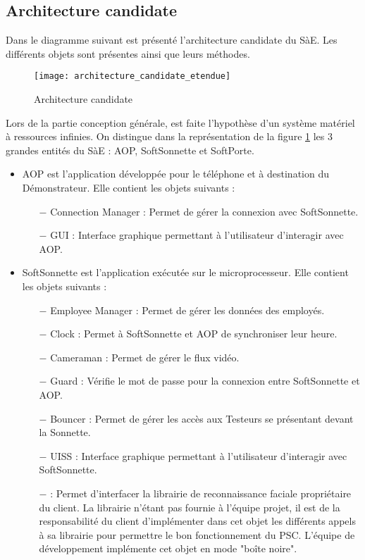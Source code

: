 \subsection{Architecture candidate}

Dans le diagramme suivant est présenté l'architecture candidate du SàE. 
Les différents objets sont présentes ainsi que leurs méthodes.

\begin{figure} [H]
    \centering
    \texttt{[image: architecture\_candidate\_etendue]}
    \caption{Architecture candidate}
    \label{Archicandidate}
\end{figure}

Lors de la partie conception générale, est faite l'hypothèse d'un système matériel à ressources infinies.
\newpage
On distingue dans la représentation de la figure \ref{Archicandidate} les 3 grandes entités du SàE : AOP, SoftSonnette et SoftPorte.

\begin{itemize}
    \item AOP est l'application  développée pour le téléphone et à destination du Démonstrateur. Elle contient les objets suivants :
    \begin{itemize}
        \item[$-$] Connection Manager : Permet de gérer la connexion avec SoftSonnette.
        \item[$-$] GUI : Interface graphique permettant à l'utilisateur d'interagir avec AOP.
    \end{itemize}
\end{itemize}

\begin{itemize}
    \item SoftSonnette est l'application exécutée sur le microprocesseur. Elle contient les objets suivants :
    \begin {itemize}
        \item[$-$] Employee Manager : Permet de gérer les données des employés.
        \item[$-$] Clock : Permet à SoftSonnette et AOP de synchroniser leur heure.
        \item[$-$] Cameraman : Permet de gérer le flux vidéo.
        \item[$-$] Guard : Vérifie le mot de passe pour la connexion entre SoftSonnette et AOP.
        \item[$-$] Bouncer : Permet de gérer les accès aux Testeurs se présentant devant la Sonnette.
        \item[$-$] UISS : Interface graphique permettant à l'utilisateur d'interagir avec SoftSonnette.
        \item[$-$] \IA : Permet d'interfacer la librairie de reconnaissance faciale propriétaire du client. 
        La librairie n'étant pas fournie à l'équipe projet, il est de la responsabilité du client d'implémenter dans cet objet les différents appels à sa librairie pour permettre le bon fonctionnement du PSC.
        L'équipe de développement implémente cet objet en mode "boîte noire".
    \end{itemize}
\end{itemize}

